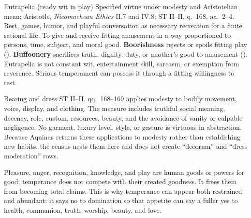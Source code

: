 \virtuedossier
  {Eutrapelia (ready wit in play)}
  {Specified virtue under modesty and Aristotelian mean; Aristotle, \emph{Nicomachean Ethics} II.7 and IV.8; ST II--II, q.~168, aa.~2--4.}
  {Rest, games, humor, and playful conversation as necessary recreation for a finite rational life.}
  {To give and receive fitting amusement in a way proportioned to persons, time, subject, and moral good.}
  {\textbf{Boorishness} rejects or spoils fitting play ().}
  {\textbf{Buffoonery} sacrifices truth, dignity, duty, or another's good to amusement ().}
  {Eutrapelia is not constant wit, entertainment skill, sarcasm, or exemption from reverence. Serious temperament can possess it through a fitting willingness to rest.}

\begin{studybox}{Bearing and dress}
ST II--II, qq.~168--169 applies modesty to bodily movement, voice, display, and clothing. The measure includes truthful social meaning, decency, role, custom, resources, beauty, and the avoidance of vanity or culpable negligence. No garment, luxury level, style, or gesture is virtuous in abstraction. Because Aquinas returns these applications to modesty rather than establishing new habits, the census nests them here and does not create ``decorum'' and ``dress moderation'' rows.
\end{studybox}


Pleasure, anger, recognition, knowledge, and play are human goods or powers for good; temperance does not compete with their created goodness. It frees them from becoming total claims. This is why temperance can appear both restrained and abundant: it says no to domination so that appetite can say a fuller yes to health, communion, truth, worship, beauty, and love.
